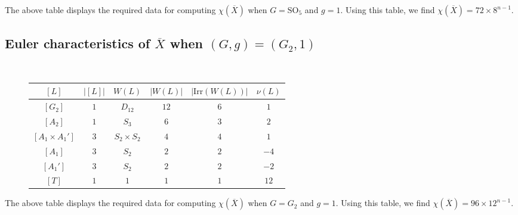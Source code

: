 \documentclass[12pt]{amsart}
\theoremstyle{plain}
\theoremstyle{definition}
\theoremstyle{remark}
\newcommand{\bX}{{X}}
\newcommand{\SO}{\mathrm{SO}}
\newcommand{\Irr}{\mathrm{Irr}}
\begin{document}
The above table displays the required data for computing $\chi(\overline{X})$ when $G=\SO_5$ and $g=1$. Using this table, we find ${\chi(\overline{\bX}) = 72 \times 8^{n-1}}$.

\newpage 


\subsection{Euler characteristics of $\overline{X}$ when $(G,g)=(G_2, 1)$}\label{s:euler} 
\mbox{}\\

\begin{figure}[h]
\begin{tabular}{|c|ccccc|} 
\hline 
$[L]$ & $|[L]|$ & $W(L)$ & $|W(L)|$ & $|\Irr(W(L))|$ & $\nu(L)$ \\
\hline 
$[G_2]$ & $1$ & $D_{12}$ & $12$ & $6$ & $1$ \\
$[{A_2}]$ & $1$ & $S_3$ & $6$ & $3$ & $2$ \\
$[{A_1\times A_1'}]$ & $3$ & $S_2\times S_2$ & $4$ & $4$ & $1$ \\
$[{A_1}]$ & $3$ & $S_2$ & $2$ & $2$ & $-4$ \\
$[{A_1'}]$ & $3$ & $S_2$ & $2$ & $2$ & $-2$ \\
$[T]$ & $1$ & $1$ & $1$ & $1$ & $12$ \\
\hline 
\end{tabular}
\end{figure}

The above table displays the required data for computing $\chi(\overline{X})$ when $G=G_2$ and $g=1$. Using this table, we find $\chi(\overline{\bX}) = 96 \times 12^{n-1}$.\\\\

\vskip10pt
\end{document}
